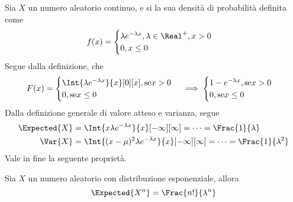 \documentclass{subfiles}
\begin{document}
Sia $X$ un numero aleatorio continuo, e si la sua densità di probabilità definita come
$$
    f(x) = \begin{cases}
        \lambda e^{-\lambda x}, \lambda \in \Real^{+}, x > 0 \\
        0, x \le 0
    \end{cases}$$
Segue dalla definizione, che
$$
    F(x) = \begin{cases}
        \Int{\lambda e^{-\lambda x}}{x}[0][x], \text{se} x > 0 \\
        0, \text{se} x \le 0
    \end{cases}   \implies \begin{cases}
        1 - e^{-\lambda x}, \text{se} x > 0 \\
        0, \text{se} x \le 0
    \end{cases}$$
Dalla definizione generale di valore atteso e varianza, segue
$$\begin{aligned}
        \Expected{X} & = \Int{x \lambda e^{-\lambda x}}{x}[-\infty][\infty] = \cdots = \Frac{1}{\lambda}               \\
        \Var{X}      & = \Int{(x - \mu)^2 \lambda e^{-\lambda x}}{x}[-\infty][\infty] = \cdots = \Frac{1}{\lambda^{2}}
    \end{aligned}$$
Vale in fine la seguente proprietà.
\begin{Property*}
    Sia $X$ un numero aleatorio con distribuzione esponenziale, allora
    $$
        \Expected{X^{n}} = \Frac{n!}{\lambda^{n}}
    $$
\end{Property*}
\end{document}

